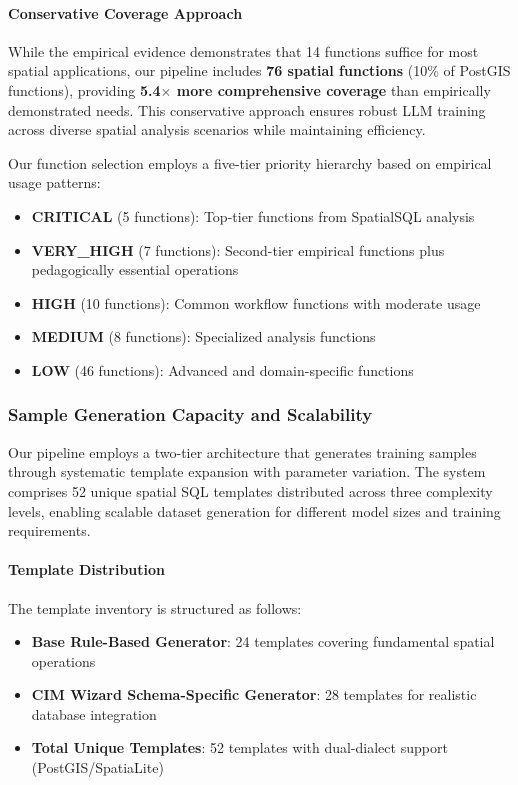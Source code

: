\paragraph{Conservative Coverage Approach}
While the empirical evidence demonstrates that 14 functions suffice for most spatial applications, our pipeline includes \textbf{76 spatial functions} (10\% of PostGIS functions), providing \textbf{5.4$\times$ more comprehensive coverage} than empirically demonstrated needs. This conservative approach ensures robust LLM training across diverse spatial analysis scenarios while maintaining efficiency.

Our function selection employs a five-tier priority hierarchy based on empirical usage patterns:
\begin{itemize}
    \item \textbf{CRITICAL} (5 functions): Top-tier functions from SpatialSQL analysis
    \item \textbf{VERY\_HIGH} (7 functions): Second-tier empirical functions plus pedagogically essential operations
    \item \textbf{HIGH} (10 functions): Common workflow functions with moderate usage
    \item \textbf{MEDIUM} (8 functions): Specialized analysis functions
    \item \textbf{LOW} (46 functions): Advanced and domain-specific functions
\end{itemize}

\subsubsection{Sample Generation Capacity and Scalability}
\label{subsubsec:sample-generation}

Our pipeline employs a two-tier architecture that generates training samples through systematic template expansion with parameter variation. The system comprises 52 unique spatial SQL templates distributed across three complexity levels, enabling scalable dataset generation for different model sizes and training requirements.

\paragraph{Template Distribution}
The template inventory is structured as follows:
\begin{itemize}
    \item \textbf{Base Rule-Based Generator}: 24 templates covering fundamental spatial operations
    \item \textbf{CIM Wizard Schema-Specific Generator}: 28 templates for realistic database integration
    \item \textbf{Total Unique Templates}: 52 templates with dual-dialect support (PostGIS/SpatiaLite)
\end{itemize}

